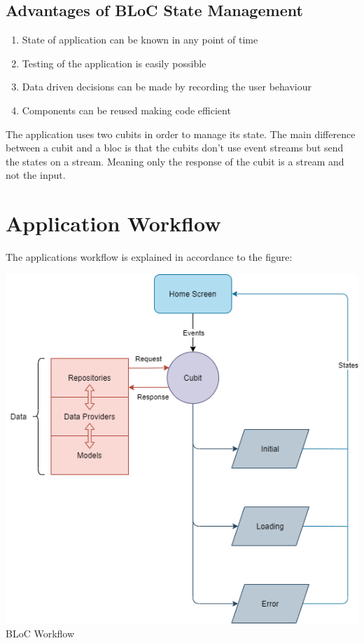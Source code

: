\documentclass[conference]{IEEEtran}
\newenvironment{Figure}
  {\par\medskip\noindent\minipage{\linewidth}}
  {\endminipage\par\medskip}
\begin{document}
\subsection{Advantages of BLoC State Management}
\begin{enumerate}
    \item State of application can be known in any point of time
    \item Testing of the application is easily possible
    \item Data driven decisions can be made by recording the user behaviour
    \item Components can be reused making code efficient
\end{enumerate}
The application uses two cubits in order to manage its state.
The main difference between a cubit and a bloc is that the cubits
don't use event streams but send the states on a stream. Meaning
only the response of the cubit is a stream and not the input.

\section{Application Workflow}
The applications workflow is explained in accordance to the figure:

\begin{Figure}
    \centering
    \includegraphics[width=\linewidth]{Images/AppWorkflow1.drawio.png}
    \label{App Workflow}
    \figurename{BLoC Workflow}
\end{Figure}
\end{document}
